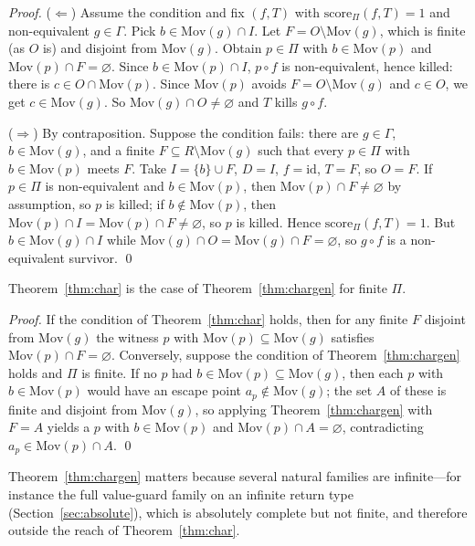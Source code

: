 \documentclass[runningheads,envcountsect,envcountsame]{llncs}
\newcommand{\Mov}{\mathrm{Mov}}
\newcommand{\score}{\mathrm{score}}
\begin{document}
\begin{proof}
($\Leftarrow$) Assume the condition and fix $(f,T)$ with $\score_\Pi(f,T) = 1$
and non-equivalent $g \in \Gamma$. Pick $b \in \Mov(g) \cap I$. Let
$F = O \setminus \Mov(g)$, which is finite (as $O$ is) and disjoint from
$\Mov(g)$. Obtain $p \in \Pi$ with $b \in \Mov(p)$ and
$\Mov(p) \cap F = \varnothing$. Since $b \in \Mov(p) \cap I$, $p \circ f$ is
non-equivalent, hence killed: there is $c \in O \cap \Mov(p)$. Since $\Mov(p)$
avoids $F = O \setminus \Mov(g)$ and $c \in O$, we get $c \in \Mov(g)$. So
$\Mov(g) \cap O \neq \varnothing$ and $T$ kills $g \circ f$.

($\Rightarrow$) By contraposition. Suppose the condition fails: there are
$g \in \Gamma$, $b \in \Mov(g)$, and a finite $F \subseteq R \setminus \Mov(g)$
such that every $p \in \Pi$ with $b \in \Mov(p)$ meets $F$. Take
$I = \{b\} \cup F$, $D = I$, $f = \mathrm{id}$, $T = F$, so $O = F$. If
$p \in \Pi$ is non-equivalent and $b \in \Mov(p)$, then
$\Mov(p) \cap F \neq \varnothing$ by assumption, so $p$ is killed; if
$b \notin \Mov(p)$, then $\Mov(p) \cap I = \Mov(p) \cap F \neq \varnothing$, so
$p$ is killed. Hence $\score_\Pi(f,T) = 1$. But $b \in \Mov(g) \cap I$ while
$\Mov(g) \cap O = \Mov(g) \cap F = \varnothing$, so $g \circ f$ is a
non-equivalent survivor. \qed
\end{proof}

\begin{corollary}
\label{cor:genfin}
Theorem~\ref{thm:char} is the case of Theorem~\ref{thm:chargen} for finite $\Pi$.
\end{corollary}

\begin{proof}
If the condition of Theorem~\ref{thm:char} holds, then for any finite $F$
disjoint from $\Mov(g)$ the witness $p$ with $\Mov(p) \subseteq \Mov(g)$
satisfies $\Mov(p) \cap F = \varnothing$. Conversely, suppose the condition of
Theorem~\ref{thm:chargen} holds and $\Pi$ is finite. If no $p$ had
$b \in \Mov(p) \subseteq \Mov(g)$, then each $p$ with $b \in \Mov(p)$ would have
an escape point $a_p \notin \Mov(g)$; the set $A$ of these is finite and disjoint
from $\Mov(g)$, so applying Theorem~\ref{thm:chargen} with $F = A$ yields a $p$
with $b \in \Mov(p)$ and $\Mov(p) \cap A = \varnothing$, contradicting
$a_p \in \Mov(p) \cap A$. \qed
\end{proof}

Theorem~\ref{thm:chargen} matters because several natural families are
infinite---for instance the full value-guard family on an infinite return type
(Section~\ref{sec:absolute}), which is absolutely complete but not finite, and
therefore outside the reach of Theorem~\ref{thm:char}.
\end{document}
